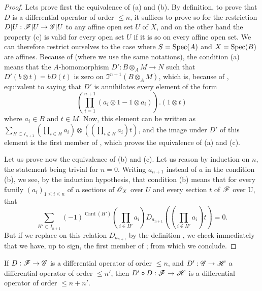 \begin{proof}
Lets prove first the equivalence of (a) and (b).
By definition, to prove that $D$ is a differential operator of order $\leq n$, it suffices to prove so for the restriction $D|U: \sh{F}|U \to \sh{G}|U$ to any affine open set $U$ of $X$, and on the other hand the property (c) is valid for every open set $U$ if it is so on every affine open set.
We can therefore restrict ourselves to the case where $S = \operatorname{Spec}(A)$ and $X = \operatorname{Spec}(B)$ are affines.
Because of  (where we use the same notations), the condition (a) means that the $A$-homomorphism $D': B \otimes_A M \to N$ such that $D'(b \otimes t) = b D(t)$ is zero on $\mathfrak{I}^{n+1}(B \otimes_A M)$, which is, because of , equivalent to saying that $D'$ is annihilates every element of the form
\[
  (\prod_{i=1}^{n+1} (a_i \otimes 1 - 1 \otimes a_i) ) . (1 \otimes t)
\]
 where $a_i \in B$ and $t \in M$.
Now, this element can be written as $\sum_{H \subset I_{n+1}} (\prod_{i \in H} a_i) \otimes ((\prod_{i \notin H} a_i ) t )$, and the image under $D'$ of this element is the first member of , which proves the equivalence of (a) and (c).

Let us prove now the equivalence of (b) and (c).
Let us reason by induction on $n$, the statement being trivial for $n=0$.
Writing $a_{n+1}$ instead of $a$ in the condition (b), we see, by the induction hypothesis, that condition (b) means that for every family $(a_i)_{1 \leq i \leq n}$ of $n$ sections of $\mathscr{O}_X$ over $U$ and every section $t$ of $\mathscr{F}$ over U, that
\[
  \sum_{H' \subset I_{n+1}} (-1)^{\operatorname{Card}(H')}  (\prod_{i \in H'} a_i) D_{a_{n+1}} ((\prod_{i \notin H'} a_i ) t ) = 0.
\]
But if we replace on this relation $D_{a_{n+1}}$ by the definition , we check immediately that we have, up to sign, the first member of ;
from which we conclude.
\end{proof}

\begin{proposition}[16.8.9]
\label{IV.16.8.9}
If $D: \sh{F} \to \sh{G}$ is a differential operator of order $\leq n$, and $D': \sh{G} \to \sh{H}$ a differential operator of order $\leq n'$, then $D' \circ D: \sh{F} \to \sh{H}$ is a differential operator of order $\leq n + n'$.
\end{proposition}


